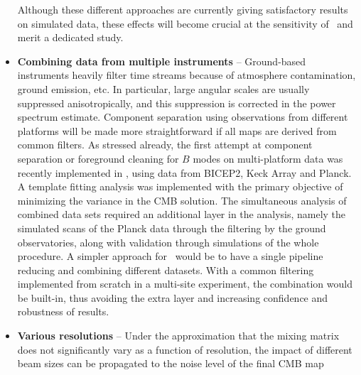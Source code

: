 \begin{itemize}
Although these different approaches are currently giving satisfactory results on simulated data, these effects will become crucial at the sensitivity of \cmbexp\ and merit a dedicated study. 
	\item \textbf{Combining data from multiple instruments} -- Ground-based instruments heavily filter time streams because of atmosphere contamination, ground emission, etc. %
	In particular, large angular scales are usually suppressed anisotropically, and this suppression is corrected in the power spectrum estimate. 
Component separation using observations from different platforms will be made more straightforward if all maps are derived from common filters. 
As stressed already, the first attempt at component separation or foreground cleaning for  $B$ modes on multi-platform data was recently implemented in \cite{Ade:2015tva}, using data from BICEP2, Keck Array and Planck. A template fitting analysis was implemented with the primary objective of minimizing the variance in the CMB solution.%
The simultaneous analysis of combined data sets 
required an additional layer in the analysis, namely the simulated scans of the Planck data through the filtering by the ground observatories, along with validation through simulations of the whole procedure. A simpler approach for \cmbexp\ would be to have a single pipeline reducing and combining different datasets. With a common filtering implemented from scratch in a multi-site experiment, the %
combination would be built-in, thus avoiding the extra layer and increasing confidence and robustness of results.
	\item \textbf{Various resolutions} -- Under the approximation that the mixing matrix does not significantly vary as a function of resolution, the impact of different beam sizes can be propagated to the noise level of the final CMB map %

\end{itemize}
